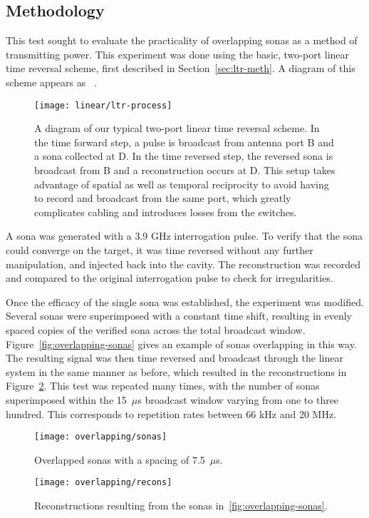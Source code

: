 \subsection{Methodology}

This test sought to evaluate the practicality of overlapping sonas as a method of transmitting power. This experiment was done using the basic, two-port linear time reversal scheme, first described in Section~\ref{sec:ltr-meth}. A diagram of this scheme appears as ~.

\begin{figure}[h!]
\centering
\texttt{[image: linear/ltr-process]}
    \caption[Two-Port Linear Time Reversal Setup]{A diagram of our typical two-port linear time reversal scheme. In the time forward step, a pulse is broadcast from antenna port B and a sona collected at D. In the time reversed step, the reversed sona is broadcast from B and a reconstruction occurs at D. This setup takes advantage of spatial as well as temporal reciprocity to avoid having to record and broadcast from the same port, which greatly complicates cabling and introduces losses from the switches.}
    \label{fig:ltr-process}
\end{figure}

A sona was generated with a 3.9 GHz interrogation pulse. To verify that the sona could converge on the target, it was time reversed without any further manipulation, and injected back into the cavity. The reconstruction was recorded and compared to the original interrogation pulse to check for irregularities.

Once the efficacy of the single sona was established, the experiment was modified. Several sonas were superimposed with a constant time shift, resulting in evenly spaced copies of the verified sona across the total broadcast window. Figure~\ref{fig:overlapping-sonas} gives an example of sonas overlapping in this way. The resulting signal was then time reversed and broadcast through the linear system in the same manner as before, which resulted in the reconstructions in Figure~\ref{fig:overlapping-recons}. This test was repeated many times, with the number of sonas superimposed within the 15~$\mu$s broadcast window varying from one to three hundred. This corresponds to repetition rates between 66 kHz and 20 MHz.

\begin{figure}
\centering
\texttt{[image: overlapping/sonas]}
\caption[Overlapped sonas]{Overlapped sonas with a spacing of 7.5~$\mu$s.}
\label{fig:overlapping-sonas}

\vspace*{\floatsep}%

\texttt{[image: overlapping/recons]}
\caption[Overlapped reconstructions]{Reconstructions resulting from the sonas in~\ref{fig:overlapping-sonas}.}
\label{fig:overlapping-recons}
\end{figure}


